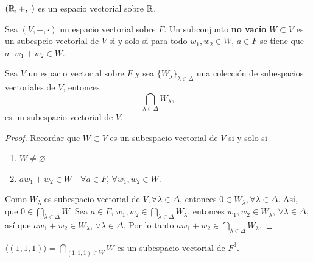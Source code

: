 \documentclass[12pt,a4paper]{book}
\begin{document}
    \begin{ejemplo}
        $(\mathbb{R},+,\cdot)$ es un espacio vectorial sobre $\mathbb{R}$.
    \end{ejemplo}

    \begin{proposicion}
        Sea $(V,+,\cdot)$ un espacio vectorial sobre $F$. Un subconjunto \textbf{no vacío}
        $W\subset V$ es un subespcio vectorial de $V$ si y solo si para todo $w_{1},w_{2}\in W$,
        $a\in F$ se tiene que $a\cdot w_{1}+w_{2}\in W$.
    \end{proposicion}

    \vspace{1.5cm}

    \begin{proposicion}
        Sea $V$ un espacio vectorial sobre $F$ y sea $\{W_{\lambda}\}_{\lambda\in\Delta}$
        una colección de subespacios vectoriales de $V$, entonces
        \begin{equation*}
            \bigcap_{\lambda\in\Delta}W_{\lambda},
        \end{equation*}
        es un subespacio vectorial de $V$.
    \end{proposicion}

    \begin{proof}
        Recordar que $W\subset V$ es un subespacio vectorial de $V$ si y solo si
        \begin{enumerate}
            \item[(a)] $W\neq\varnothing$
            \item[(b)] $aw_{1}+w_{2}\in W\quad\forall a\in F$, $\forall w_{1},w_{2}\in W$.  
        \end{enumerate}
        Como $W_{\lambda}$ es subespacio vectorial de $V, \forall\lambda\in\Delta$, entonces
        $0\in W_{\lambda}, \forall\lambda\in\Delta$. Así, que $0\in\bigcap_{\lambda\in\Delta}W$.
        Sea $a\in F$, $w_{1},w_{2}\in\bigcap_{\lambda\in\Delta}W_{\lambda}$, entonces $w_{1},w_{2}\in W_{\lambda}$,
        $\forall\lambda\in\Delta$, así que $aw_{1}+w_{2}\in W_{\lambda}$, $\forall\lambda\in\Delta$.
        Por lo tanto $aw_{1}+w_{2}\in\bigcap_{\lambda\in\Delta}W_{\lambda}$.
    \end{proof}

    \begin{ejemplo}
        $\langle(1,1,1)\rangle=\bigcap_{(1,1,1)\in W}W$ es un subespacio vectorial
        de $F^{3}$.
    \end{ejemplo}
\end{document}
